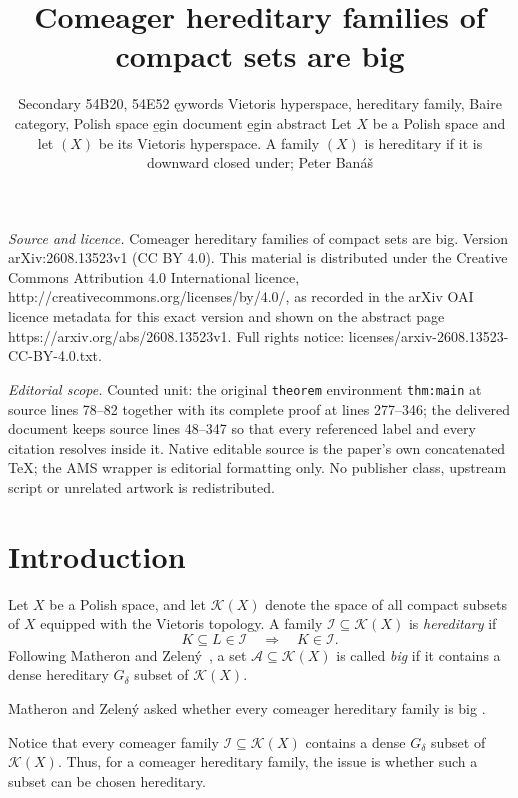 \documentclass[10pt,a4paper]{amsart}
\newcommand{\K}{\mathcal K}
\newcommand{\I}{\mathcal I}
\begin{document}
\title[Comeager hereditary families of compact sets are big]{Comeager hereditary families of compact sets are big}
\author{Secondary 54B20, 54E52 ęywords Vietoris hyperspace, hereditary family, Baire category, Polish space e̱gin document e̱gin abstract Let $X$ be a Polish space and let $ (X)$ be its Vietoris hyperspace. A family $ (X)$ is hereditary if it is downward closed under; Peter Banáš}
\date{}
\maketitle
\noindent\emph{Source and licence.} Comeager hereditary families of compact sets are big. Version arXiv:2608.13523v1 (CC BY 4.0). This material is distributed under the Creative Commons Attribution 4.0 International licence, http://creativecommons.org/licenses/by/4.0/, as recorded in the arXiv OAI licence metadata for this exact version and shown on the abstract page https://arxiv.org/abs/2608.13523v1. Full rights notice: licenses/arxiv-2608.13523-CC-BY-4.0.txt.\par\smallskip
\noindent\textit{Editorial scope.} Counted unit: the original \texttt{theorem} environment \texttt{thm:main} at source lines 78--82 together with its complete proof at lines 277--346; the delivered document keeps source lines 48--347 so that every referenced label and every citation resolves inside it. Native editable source is the paper's own concatenated TeX; the AMS wrapper is editorial formatting only. No publisher class, upstream script or unrelated artwork is redistributed.
\section{Introduction}

Let $X$ be a Polish space, and let $\K(X)$ denote the space of all compact
subsets of $X$ equipped with the Vietoris topology.
A family $\I\subseteq\K(X)$ is \emph{hereditary} if
\[
K\subseteq L\in\I \quad\Longrightarrow\quad K\in\I.
\]
Following Matheron and Zelený~\cite{MZ05}, a set
$\mathcal A\subseteq\K(X)$ is called \emph{big} if it contains a dense
hereditary $G_\delta$ subset of $\K(X)$.


Matheron and Zelený asked whether every comeager hereditary family is big
\cite[Problem~2.1]{MZ05}. 

Notice that every comeager family $\I \subseteq\K(X)$ contains a dense $G_\delta$ subset of $\K(X)$. Thus, for a comeager hereditary family, the issue is whether such a subset can be chosen hereditary.
\end{document}
